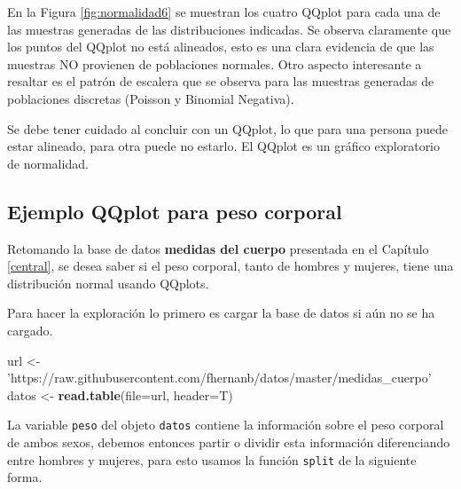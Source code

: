 \documentclass[10pt,]{krantz}
\makeatletter
\newenvironment{Shaded}{\begin{snugshade}}{\end{snugshade}}
\newcommand{\KeywordTok}[1]{\textcolor[rgb]{0.13,0.29,0.53}{\textbf{#1}}}
\newcommand{\DataTypeTok}[1]{\textcolor[rgb]{0.13,0.29,0.53}{#1}}
\newcommand{\StringTok}[1]{\textcolor[rgb]{0.31,0.60,0.02}{#1}}
\newcommand{\OperatorTok}[1]{\textcolor[rgb]{0.81,0.36,0.00}{\textbf{#1}}}
\newcommand{\NormalTok}[1]{#1}
\newenvironment{kframe}{%
\medskip{}
\setlength{\fboxsep}{.8em}
 \def\at@end@of@kframe{}%
 \ifinner\ifhmode%
  \def\at@end@of@kframe{\end{minipage}}%
  \begin{minipage}{\columnwidth}%
 \fi\fi%
 \def\FrameCommand##1{\hskip\@totalleftmargin \hskip-\fboxsep
 \colorbox{shadecolor}{##1}\hskip-\fboxsep
     \hskip-\linewidth \hskip-\@totalleftmargin \hskip\columnwidth}%
 \MakeFramed {\advance\hsize-\width
   \@totalleftmargin\z@ \linewidth\hsize
   \@setminipage}}%
 {\par\unskip\endMakeFramed%
 \at@end@of@kframe}
\renewenvironment{Shaded}{\begin{kframe}}{\end{kframe}}
\let\BeginKnitrBlock\begin \let\EndKnitrBlock\end
\makeatother
\begin{document}
En la Figura \ref{fig:normalidad6} se muestran los cuatro QQplot para
cada una de las muestras generadas de las distribuciones indicadas. Se
observa claramente que los puntos del QQplot no está alineados, esto es
una clara evidencia de que las muestras NO provienen de poblaciones
normales. Otro aspecto interesante a resaltar es el patrón de escalera
que se observa para las muestras generadas de poblaciones discretas
(Poisson y Binomial Negativa).

\BeginKnitrBlock{rmdwarning}
Se debe tener cuidado al concluir con un QQplot, lo que para una persona
puede estar alineado, para otra puede no estarlo. El QQplot es un
gráfico exploratorio de normalidad.
\EndKnitrBlock{rmdwarning}

\subsection*{Ejemplo QQplot para peso
corporal}\label{ejemplo-qqplot-para-peso-corporal}


Retomando la base de datos \textbf{medidas del cuerpo} presentada en el
Capítulo \ref{central}, se desea saber si el peso corporal, tanto de
hombres y mujeres, tiene una distribución normal usando QQplots.

Para hacer la exploración lo primero es cargar la base de datos si aún
no se ha cargado.

\begin{Shaded}
\begin{Highlighting}[]
\NormalTok{url <-}\StringTok{ 'https://raw.githubusercontent.com/fhernanb/datos/master/medidas_cuerpo'}
\NormalTok{datos <-}\StringTok{ }\KeywordTok{read.table}\NormalTok{(}\DataTypeTok{file=}\NormalTok{url, }\DataTypeTok{header=}\NormalTok{T)}
\end{Highlighting}
\end{Shaded}

La variable \texttt{peso} del objeto \texttt{datos} contiene la
información sobre el peso corporal de ambos sexos, debemos entonces
partir o dividir esta información diferenciando entre hombres y mujeres,
para esto usamos la función \texttt{split} de la siguiente forma.

\begin{Shaded}
\end{Shaded}
\end{document}
